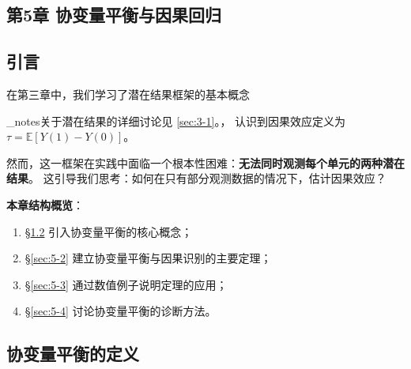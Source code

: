 

\begin{refsection}
\chapter{第5章 协变量平衡与因果回归}\label{ch:5}

\section{引言}\label{sec:5-intro}

在第三章中，我们学习了潜在结果框架的基本概念%
\addtocounter{footnote}{1}\addtocounter{footnote}{-1}\footnotesize%
\par\_notes{关于潜在结果的详细讨论见 \cref{sec:3-1}。}，
认识到因果效应定义为%
$\tau = \mathbb{E}[Y(1) - Y(0)]$。

然而，这一框架在实践中面临一个根本性困难：\textbf{无法同时观测每个单元的两种潜在结果}。
这引导我们思考：如何在只有部分观测数据的情况下，估计因果效应？

\textbf{本章结构概览}：
\begin{enumerate}
\item \S\ref{sec:5-1} 引入协变量平衡的核心概念；
\item \S\ref{sec:5-2} 建立协变量平衡与因果识别的主要定理；
\item \S\ref{sec:5-3} 通过数值例子说明定理的应用；
\item \S\ref{sec:5-4} 讨论协变量平衡的诊断方法。
\end{enumerate}

\section{协变量平衡的定义}\label{sec:5-1}


\end{refsection}
